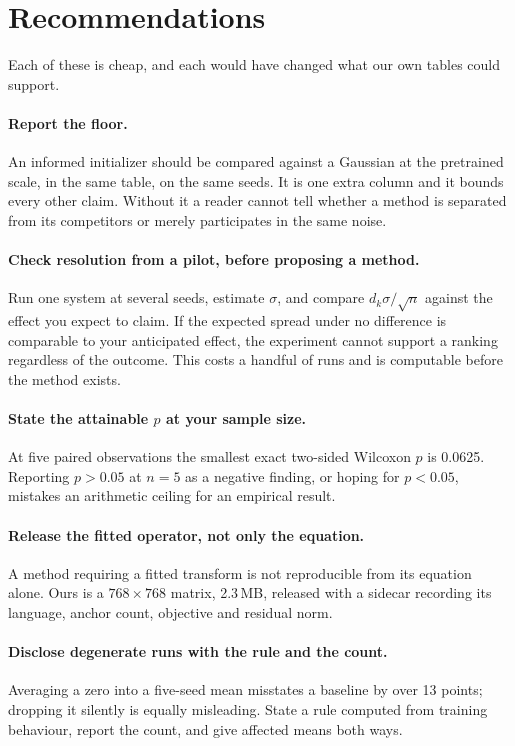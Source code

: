 \documentclass[11pt]{article}
\begin{document}
\section{Recommendations}
\label{sec:recs}

Each of these is cheap, and each would have changed what our own tables could
support.

\paragraph{Report the floor.} An informed initializer should be compared
against a Gaussian at the pretrained scale, in the same table, on the same
seeds. It is one extra column and it bounds every other claim. Without it a
reader cannot tell whether a method is separated from its competitors or
merely participates in the same noise.

\paragraph{Check resolution from a pilot, before proposing a method.}
Run one system at several seeds, estimate $\sigma$, and compare
$d_k\sigma/\sqrt{n}$ against the effect you expect to claim. If the expected
spread under no difference is comparable to your anticipated effect, the
experiment cannot support a ranking regardless of the outcome. This costs a
handful of runs and is computable before the method exists.

\paragraph{State the attainable $p$ at your sample size.} At five paired
observations the smallest exact two-sided Wilcoxon $p$ is 0.0625. Reporting
$p > 0.05$ at $n = 5$ as a negative finding, or hoping for $p < 0.05$,
mistakes an arithmetic ceiling for an empirical result.

\paragraph{Release the fitted operator, not only the equation.} A method
requiring a fitted transform is not reproducible from its equation alone.
Ours is a $768\times768$ matrix, 2.3\,MB, released with a sidecar recording
its language, anchor count, objective and residual norm.

\paragraph{Disclose degenerate runs with the rule and the count.} Averaging a
zero into a five-seed mean misstates a baseline by over 13 points; dropping
it silently is equally misleading. State a rule computed from training
behaviour, report the count, and give affected means both ways.
\end{document}
